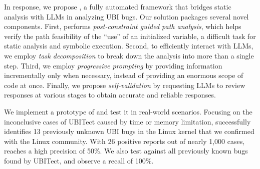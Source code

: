 In response, we propose \work, a fully automated framework that bridges static analysis with LLMs in analyzing UBI bugs.
Our solution packages several novel components.
First, \work performs \textit{post-constraint guided path analysis}, which helps verify the path feasibility of the ``use'' of an initialized variable, a difficult task for static analysis and symbolic execution.
Second, to efficiently interact with LLMs, we employ \textit{task decomposition} to break down the analysis into more than a single step. 
Third, we employ \textit{progressive prompting} by providing information incrementally only when necessary, instead of providing an enormous scope of code at once.
Finally, we propose \textit{self-validation} by requesting LLMs to review responses at various stages to obtain accurate and reliable responses. 

We implement a prototype of \work and test it in real-world scenarios. 
Focusing on the inconclusive cases of UBITect caused by time or memory limitation, \work successfully identifies 13 previously unknown UBI bugs in the Linux kernel that we confirmed with the Linux community. 
With 26 positive reports out of nearly 1,000 cases, \work reaches a high precision of 50\%. 
We also test \work against all previously known bugs found by UBITect, and observe a recall of 100\%.



